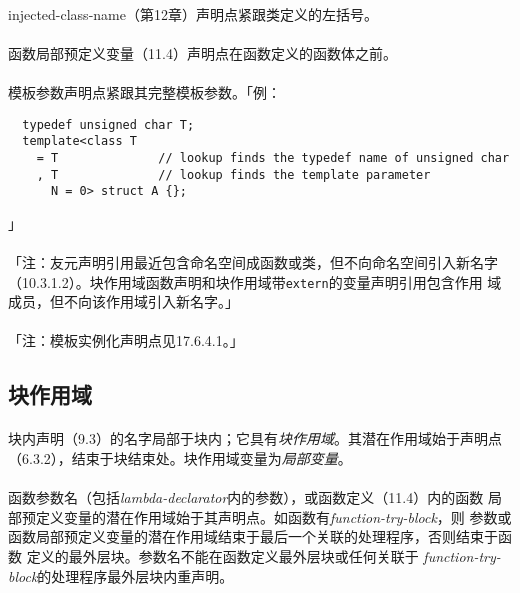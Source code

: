 \paragraph{}
injected-class-name（第12章）声明点紧跟类定义的左括号。

\paragraph{}
函数局部预定义变量（11.4）声明点在函数定义的函数体之前。

\paragraph{}
模板参数声明点紧跟其完整模板参数。「例：
\begin{lstlisting}
  typedef unsigned char T;
  template<class T
    = T              // lookup finds the typedef name of unsigned char
    , T              // lookup finds the template parameter
      N = 0> struct A {};
\end{lstlisting}
」

\paragraph{}
「注：友元声明引用最近包含命名空间成函数或类，但不向命名空间引入新名字
（10.3.1.2）。块作用域函数声明和块作用域带\texttt{extern}的变量声明引用包含作用
域成员，但不向该作用域引入新名字。」

\paragraph{}
「注：模板实例化声明点见17.6.4.1。」

\subsection{块作用域}

\paragraph{}
块内声明（9.3）的名字局部于块内；它具有\textit{块作用域}。其潜在作用域始于声明点
（6.3.2），结束于块结束处。块作用域变量为\textit{局部变量}。

\paragraph{}
函数参数名（包括\textit{lambda-declarator}内的参数），或函数定义（11.4）内的函数
局部预定义变量的潜在作用域始于其声明点。如函数有\textit{function-try-block}，则
参数或函数局部预定义变量的潜在作用域结束于最后一个关联的处理程序，否则结束于函数
定义的最外层块。参数名不能在函数定义最外层块或任何关联于
\textit{function-try-block}的处理程序最外层块内重声明。

